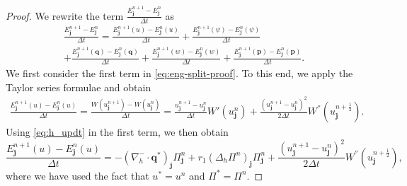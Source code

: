 \documentclass[11pt]{article}
\numberwithin{equation}{section}
\newtheorem{counter example}[theorem]{Counter Example}
\numberwithin{equation}{section}
\numberwithin{equation}{section}
\newcommand{\half}{\frac{1}{2}}
\begin{document}
\begin{proof}
We rewrite the term $\frac{E_{\mathbf{j}}^{n+1}-E_{\mathbf{j}}^{n}}{\Delta t}$ as
\begin{multline}
\label{eq:eng-split-proof}
\frac{E_{\mathbf{j}}^{n+1}-E_{\mathbf{j}}^{n}}{\Delta t}
=\frac{E_{\mathbf{j}}^{n+1}(u)-E_{\mathbf{j}}^{n}(u)}{\Delta t}+\frac{E_{\mathbf{j}}^{n+1}(\psi)-E_{\mathbf{j}}^{n}(\psi)}{\Delta t}\\
+\frac{E_{\mathbf{j}}^{n+1}(\mathbf{q})-E_{\mathbf{j}}^{n}(\mathbf{q})}{\Delta t}+\frac{E_{\mathbf{j}}^{n+1}(w)-E_{\mathbf{j}}^{n}(w)}{\Delta t}+\frac{E_{\mathbf{j}}^{n+1}(\mathbf{p})-E_{\mathbf{j}}^{n}(\mathbf{p})}{\Delta t}.
\end{multline}
We first consider the first term in \eqref{eq:eng-split-proof}. To this end, we apply the Taylor series formulae and obtain
\begin{align*}
\frac{E_{\mathbf{j}}^{n+1}(u)-E_{\mathbf{j}}^{n}(u)}{\Delta t}=\frac{W(u_{\mathbf{j}}^{n+1})-W(u_{\mathbf{j}}^{n})}{\Delta t}
=\frac{u_{\mathbf{j}}^{n+1}-u_{\mathbf{j}}^{n}}{\Delta t}W'(u_{\mathbf{j}}^{n})+\frac{(u_{\mathbf{j}}^{n+1}-u_{\mathbf{j}}^n)^2}{2 \Delta t}W^{''}(u_{\mathbf{j}}^{n+\half}).
\end{align*} 
Using \eqref{eq:h_updt} in the first term, we then obtain
\begin{equation}
\label{eq:h-energy-proof}
\frac{E_{\mathbf{j}}^{n+1}(u)-E_{\mathbf{j}}^{n}(u)}{\Delta t}=-(\nabla_h^{-} \cdot \mathbf{q}^*)_{\mathbf{j}}\Pi^n_{\mathbf{j}}+r_1(\Delta_h \Pi^n)_{\mathbf{j}}\Pi^n_{\mathbf{j}}+\frac{(u_{\mathbf{j}}^{n+1}-u_{\mathbf{j}}^n)^2}{2 \Delta t}W^{''}(u_{\mathbf{j}}^{n+\half}),
\end{equation}
where we have used the fact that $u^*=u^n$ and $\Pi^*=\Pi^n$.


\end{proof}
\end{document}
